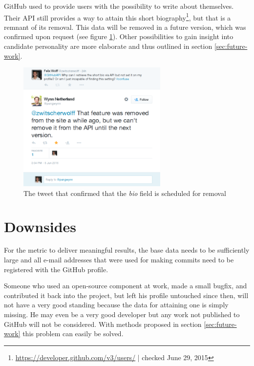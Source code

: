 GitHub used to provide users with the possibility to write about themselves. Their API still provides a way to attain this short biography\footnote{\url{https://developer.github.com/v3/users/} | checked June 29, 2015}, but that is a remnant of its removal. This data will be removed in a future version, which was confirmed upon request (see figure \ref{fig:gapitweet}). Other possibilities to gain insight into candidate personality are more elaborate and thus outlined in section \ref{sec:future-work}.

\begin{figure}
  \centering
  \includegraphics[width=20em]{gfx/githubapi_tweet.png}
  \caption{The tweet that confirmed that the \textit{bio} field is scheduled for removal}
  \label{fig:gapitweet}
\end{figure}

\section{Downsides}\label{sec:threatstovalidity}
For the metric to deliver meaningful results, the base data needs to be sufficiently large and all e-mail addresses that were used for making commits need to be registered with the GitHub profile.

Someone who used an open-source component at work, made a small bugfix, and contributed it back into the project, but left his profile untouched since then, will not have a very good standing because the data for attaining one is simply missing. He may even be a very good developer but any work not published to GitHub will not be considered. With methods proposed in section \ref{sec:future-work} this problem can easily be solved.